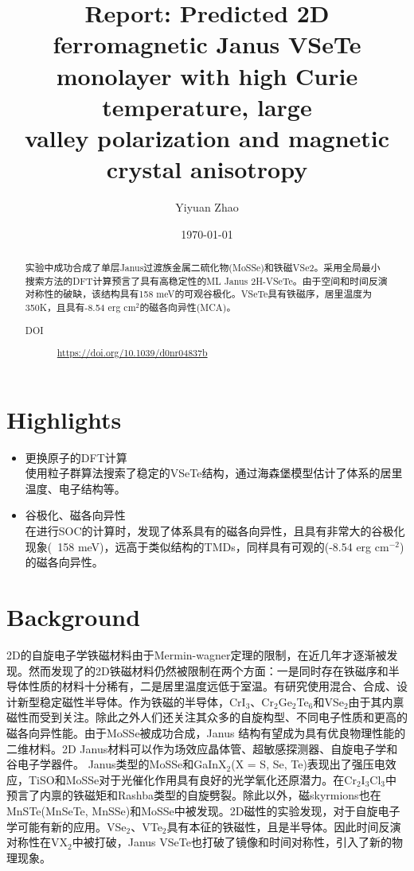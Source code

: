 \documentclass[reprint, aps, prb, showkeys]{revtex4-2}
\begin{document}
\title{Report: Predicted 2D ferromagnetic Janus VSeTe \\
monolayer with high Curie temperature, large \\
valley polarization and magnetic crystal anisotropy}

\author{Yiyuan Zhao}
\date{\today}

\begin{abstract}
实验中成功合成了单层Janus过渡族金属二硫化物(MoSSe)和铁磁VSe2。采用全局最小搜索方法的DFT计算预言了具有高稳定性的ML Janus 2H-VSeTe。由于空间和时间反演对称性的破缺，该结构具有158 meV的可观谷极化。VSeTe具有铁磁序，居里温度为350K，且具有-8.54 erg cm$^2$的磁各向异性(MCA)。
\begin{description}
    \item[DOI] \url{https://doi.org/10.1039/d0nr04837b}
\end{description}
\end{abstract}


\maketitle
\section{Highlights}
\begin{itemize}
    \item 更换原子的DFT计算 \\
    使用粒子群算法搜索了稳定的VSeTe结构，通过海森堡模型估计了体系的居里温度、电子结构等。
    \item 谷极化、磁各向异性 \\
    在进行SOC的计算时，发现了体系具有的磁各向异性，且具有非常大的谷极化现象(~158 meV)，远高于类似结构的TMDs，同样具有可观的(-8.54 erg cm$^{-2}$)的磁各向异性。
\end{itemize}


\section{Background}
2D的自旋电子学铁磁材料由于Mermin-wagner定理的限制，在近几年才逐渐被发现。然而发现了的2D铁磁材料仍然被限制在两个方面：一是同时存在铁磁序和半导体性质的材料十分稀有，二是居里温度远低于室温。有研究使用混合、合成、设计新型稳定磁性半导体。作为铁磁的半导体，CrI$_3$、Cr$_2$Ge$_2$Te$_6$和VSe$_2$由于其内禀磁性而受到关注。除此之外人们还关注其众多的自旋构型、不同电子性质和更高的磁各向异性能。由于MoSSe被成功合成，Janus 结构有望成为具有优良物理性能的二维材料。2D Janus材料可以作为场效应晶体管、超敏感探测器、自旋电子学和谷电子学器件。 Janus类型的MoSSe和GaInX$_2$(X = S, Se, Te)表现出了强压电效应，TiSO和MoSSe对于光催化作用具有良好的光学氧化还原潜力。在Cr$_2$I$_3$Cl$_3$中预言了内禀的铁磁矩和Rashba类型的自旋劈裂。除此以外，磁skyrmions也在MnSTe(MnSeTe, MnSSe)和MoSSe中被发现。2D磁性的实验发现，对于自旋电子学可能有新的应用。VSe$_2$、VTe$_2$具有本征的铁磁性，且是半导体。因此时间反演对称性在VX$_2$中被打破，Janus VSeTe也打破了镜像和时间对称性，引入了新的物理现象。
\end{document}
